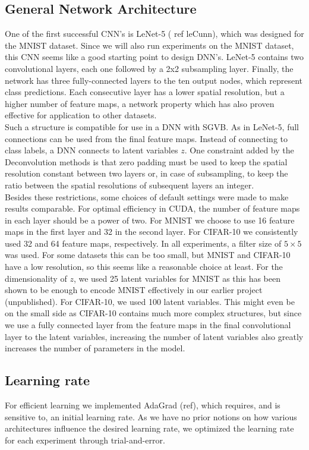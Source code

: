 \subsection{General Network Architecture}
One of the first successful CNN's is LeNet-5 ( ref leCunn), which was designed for the MNIST dataset. Since we will also run experiments on the MNIST dataset, this CNN seems like a good starting point to design DNN's. LeNet-5 contains two convolutional layers, each one followed by a 2x2 subsampling layer. Finally, the network has three fully-connected layers to the ten output nodes, which represent class predictions. Each consecutive layer has a lower spatial resolution, but a higher number of feature maps, a network property which has also proven effective for application to other datasets.\\
Such a structure is compatible for use in a DNN with SGVB. As in LeNet-5, full connections can be used from the final feature maps. Instead of connecting to class labels, a DNN connects to latent variables $z$. One constraint added by the Deconvolution methods is that zero padding must be used to keep the spatial resolution constant between two layers or, in case of subsampling, to keep the ratio between the spatial resolutions of subsequent layers an integer.  \\
Besides these restrictions, some choices of default settings were made to make results comparable. For optimal efficiency in CUDA, the number of feature maps in each layer should be a power of two. For MNIST we choose to use 16 feature maps in the first layer and 32 in the second layer. For CIFAR-10 we consistently used 32 and 64 feature maps, respectively. In all experiments, a filter size of $5 \times 5$ was used. For some datasets this can be too small, but MNIST and CIFAR-10 have a low resolution, so this seems like a reasonable choice at least. For the dimensionality of $z$, we used 25 latent variables for MNIST as this has been shown to be enough to encode MNIST effectively in our earlier project (unpublished). For CIFAR-10, we used 100 latent variables. This might even be on the small side as CIFAR-10 contains much more complex structures, but since we use a fully connected layer from the feature maps in the final convolutional layer to the latent variables, increasing the number of latent variables also greatly increases the number of parameters in the model.

\subsection{Learning rate}

For efficient learning we implemented AdaGrad (ref), which requires, and is sensitive to, an initial learning rate. As we have no prior notions on how various architectures influence the desired learning rate, we optimized the learning rate for each experiment through trial-and-error.

\newpage